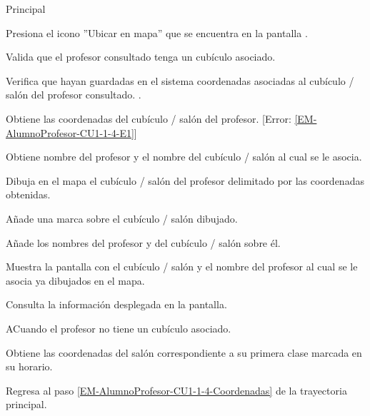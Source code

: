 \begin{UCtrayectoria}{Principal}

	\UCpaso[\UCactor] Presiona el icono ''Ubicar en mapa'' que se encuentra en la pantalla .

	\UCpaso Valida que el profesor consultado tenga un cubículo asociado. 

	\UCpaso Verifica que hayan guardadas en el sistema coordenadas asociadas al cubículo / salón del profesor consultado.
	 . \label{EM-AlumnoProfesor-CU1-1-4-Coordenadas}

	\UCpaso Obtiene las coordenadas del cubículo / salón del profesor. [Error: \ref{EM-AlumnoProfesor-CU1-1-4-E1}]		

	\UCpaso Obtiene nombre del profesor y el nombre del cubículo / salón al cual se le asocia. 

	\UCpaso Dibuja en el mapa el cubículo / salón del profesor delimitado por las coordenadas obtenidas. 

	\UCpaso Añade una marca sobre el cubículo / salón dibujado.
	
	\UCpaso Añade los nombres del profesor y del cubículo / salón sobre él.
	
	\UCpaso Muestra la pantalla  con el cubículo / salón y el nombre del profesor
	al cual se le asocia ya dibujados en el mapa.

	\UCpaso[\UCactor] Consulta la información desplegada en la pantalla.

\end{UCtrayectoria}

\begin{UCtrayectoriaA}{A}{Cuando el profesor no tiene un cubículo asociado.}

	\UCpaso Obtiene las coordenadas del salón correspondiente a su primera clase marcada en su horario. 

	\UCpaso Regresa al paso \ref{EM-AlumnoProfesor-CU1-1-4-Coordenadas} de la trayectoria principal.

\end{UCtrayectoriaA}

